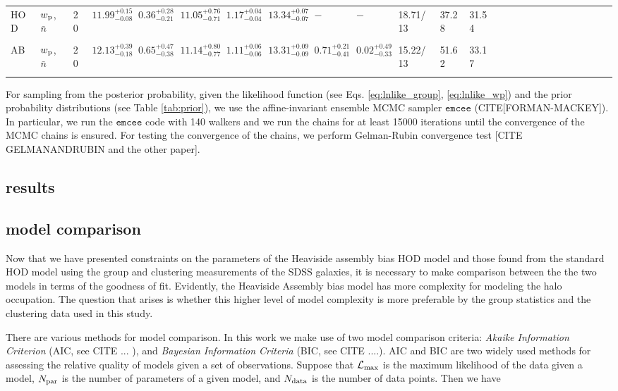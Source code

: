 \documentclass[14pt, preprint]{emulateapj}
\newcommand{\wpp}{w_{\rm p}}
\begin{document}
\begin{table*}
\begin{center}
\begin{tabular}{@{}lllllllllllllllllllllllll}
HOD & $\wpp$, $\bar{n}$ & 20 & $11.99^{+0.15}_{-0.08}$ &  $0.36^{+0.28}_{-0.21}$ & $11.05^{+0.76}_{-0.71}$ & $1.17^{+0.04}_{-0.04}$ &  $13.34^{+0.07}_{-0.07}$ & $-$ & $-$ & 18.71/13 & 37.28 & 31.54\\ \\

AB & $\wpp$, $\bar{n}$ & 20 & $12.13^{+0.39}_{-0.18}$ &  $0.65^{+0.47}_{-0.38}$ & $11.14^{+0.80}_{-0.77}$ & $1.11^{+0.06}_{-0.06}$ &  $13.31^{+0.09}_{-0.09}$ & $0.71^{+0.21}_{-0.41}$ & $0.02^{+0.49}_{-0.33}$ & 15.22/13 & 51.62 & 33.17\\ \\
                 
 \hline
  \end{tabular}
\end{center}
\end{table*}


For sampling from the posterior probability, given the likelihood function (see Eqs. \ref{eq:lnlike_group}, \ref{eq:lnlike_wp}) and the prior probability distributions (see Table \ref{tab:prior}), we use the affine-invariant ensemble MCMC sampler $\mathtt{emcee}$ (CITE[FORMAN-MACKEY]). In particular, we run the $\mathtt{emcee}$ code with 140 walkers and we run the chains for at least 15000 iterations until the convergence of the MCMC chains is ensured. For testing the convergence of the chains, we perform Gelman-Rubin convergence test [CITE GELMANANDRUBIN and the other paper].

\subsection{results}


\subsection{model comparison}

Now that we have presented constraints on the parameters of the Heaviside assembly bias HOD model and those found from the standard HOD model using the group and clustering measurements of the SDSS galaxies, it is necessary to make comparison between the the two models in terms of the goodness of fit. Evidently, the Heaviside Assembly bias model has more complexity for modeling the halo occupation. The question that arises is whether this higher level of model complexity is more preferable by the group statistics and the clustering data used in this study. 

There are various methods for model comparison. In this work we make use of two model comparison criteria: \emph{Akaike Information Criterion} (AIC, see CITE ... ), and \emph{Bayesian Information Criteria} (BIC, see CITE ....). AIC and BIC are two widely used methods for assessing the relative quality of models given a set of observations.
Suppose that $\mathcal{L}_{\rm max}$ is the maximum likelihood of the data given a model, $N_{\rm par}$ is the number of parameters of a given model, and $N_{\rm data}$ is the number of data points. Then we have
\end{document}
